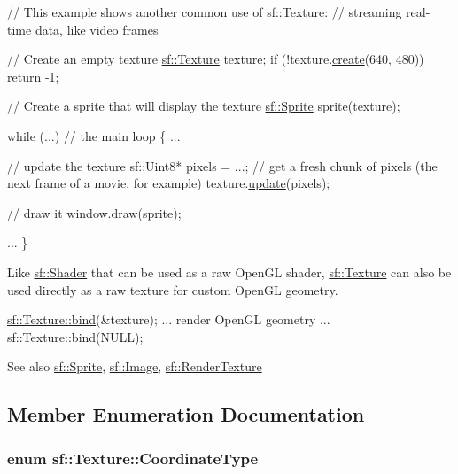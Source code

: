\begin{DoxyCode}
\textcolor{comment}{// This example shows another common use of sf::Texture:}
\textcolor{comment}{// streaming real-time data, like video frames}

\textcolor{comment}{// Create an empty texture}
\hyperlink{classsf_1_1_texture}{sf::Texture} texture;
\textcolor{keywordflow}{if} (!texture.\hyperlink{classsf_1_1_texture_a89b4c7d204acf1033c3a1b6e0a3ad0a3}{create}(640, 480))
    \textcolor{keywordflow}{return} -1;

\textcolor{comment}{// Create a sprite that will display the texture}
\hyperlink{classsf_1_1_sprite}{sf::Sprite} sprite(texture);

\textcolor{keywordflow}{while} (...) \textcolor{comment}{// the main loop}
\{
    ...

    \textcolor{comment}{// update the texture}
    sf::Uint8* pixels = ...; \textcolor{comment}{// get a fresh chunk of pixels (the next frame of a movie, for example)}
    texture.\hyperlink{classsf_1_1_texture_ae4eab5c6781316840b0c50ad08370963}{update}(pixels);

    \textcolor{comment}{// draw it}
    window.draw(sprite);

    ...
\}
\end{DoxyCode}


Like \hyperlink{classsf_1_1_shader}{sf\+::\+Shader} that can be used as a raw Open\+G\+L shader, \hyperlink{classsf_1_1_texture}{sf\+::\+Texture} can also be used directly as a raw texture for custom Open\+G\+L geometry. 
\begin{DoxyCode}
\hyperlink{classsf_1_1_texture_ae9a4274e7b95ebf7244d09c7445833b0}{sf::Texture::bind}(&texture);
... render OpenGL geometry ...
sf::Texture::bind(NULL);
\end{DoxyCode}


\begin{DoxySeeAlso}{See also}
\hyperlink{classsf_1_1_sprite}{sf\+::\+Sprite}, \hyperlink{classsf_1_1_image}{sf\+::\+Image}, \hyperlink{classsf_1_1_render_texture}{sf\+::\+Render\+Texture} 
\end{DoxySeeAlso}


\subsection{Member Enumeration Documentation}
\hypertarget{classsf_1_1_texture_aa6fd3bbe3c334b3c4428edfb2765a82e}{
\subsubsection[{Coordinate\+Type}]{\setlength{\rightskip}{0pt plus 5cm}enum {\bf sf\+::\+Texture\+::\+Coordinate\+Type}}}\label{classsf_1_1_texture_aa6fd3bbe3c334b3c4428edfb2765a82e}


